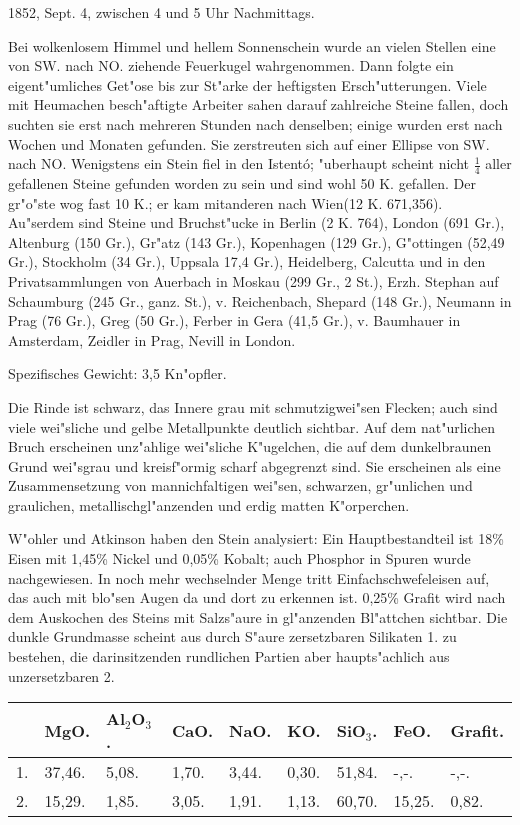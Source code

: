 \documentclass[a4paper, 11pt, oneside]{article}
\begin{document}
1852, Sept. 4, zwischen 4 und 5 Uhr Nachmittags.

Bei wolkenlosem Himmel und hellem Sonnenschein wurde an vielen Stellen eine von SW. nach NO. ziehende Feuerkugel wahrgenommen. Dann folgte ein eigent"umliches Get"ose bis zur St"arke der heftigsten Ersch"utterungen. Viele mit Heumachen besch"aftigte Arbeiter sahen darauf zahlreiche Steine fallen, doch suchten sie erst nach mehreren Stunden nach denselben; einige wurden erst nach Wochen und Monaten gefunden. Sie zerstreuten sich auf einer Ellipse von SW. nach NO. Wenigstens ein Stein fiel in den Istentó; "uberhaupt scheint nicht $\frac{1}{4}$ aller gefallenen Steine gefunden worden zu sein und sind wohl 50 K. gefallen. Der gr"o"ste wog fast 10 K.; er kam mitanderen nach Wien(12 K. 671,356). Au"serdem sind Steine und Bruchst"ucke in Berlin (2 K. 764), London (691 Gr.), Altenburg (150 Gr.), Gr"atz (143 Gr.), Kopenhagen (129 Gr.), G"ottingen (52,49 Gr.), Stockholm (34 Gr.), Uppsala 17,4 Gr.), Heidelberg, Calcutta und in den Privatsammlungen von Auerbach in Moskau (299 Gr., 2 St.), Erzh. Stephan auf Schaumburg (245 Gr., ganz. St.), v. Reichenbach, Shepard (148 Gr.), Neumann in Prag (76 Gr.), Greg (50 Gr.), Ferber in Gera (41,5 Gr.), v. Baumhauer in Amsterdam, Zeidler in Prag, Nevill in London.

Spezifisches Gewicht: 3,5 Kn"opfler.

Die Rinde ist schwarz, das Innere grau mit schmutzigwei"sen Flecken; auch sind viele wei"sliche und gelbe Metallpunkte deutlich sichtbar. Auf dem nat"urlichen Bruch erscheinen unz"ahlige wei"sliche K"ugelchen, die auf dem dunkelbraunen Grund wei"sgrau und kreisf"ormig scharf abgegrenzt sind. Sie erscheinen als eine Zusammensetzung von mannichfaltigen wei"sen, schwarzen, gr"unlichen und graulichen, metallischgl"anzenden und erdig matten K"orperchen.

W"ohler und Atkinson haben den Stein analysiert: Ein Hauptbestandteil ist 18\% Eisen mit 1,45\% Nickel und 0,05\% Kobalt; auch Phosphor in Spuren wurde nachgewiesen. In noch mehr wechselnder Menge tritt Einfachschwefeleisen auf, das auch mit blo"sen Augen da und dort zu erkennen ist. 0,25\% Grafit wird nach dem Auskochen des Steins mit Salzs"aure in gl"anzenden Bl"attchen sichtbar. Die dunkle Grundmasse scheint aus durch S"aure zersetzbaren Silikaten 1. zu bestehen, die darinsitzenden rundlichen Partien aber haupts"achlich aus unzersetzbaren 2.

\begin{table}[!ht]
    \centering
    \begin{tabular}{l l l l l l l l l}
         & MgO. & Al$_{2}$O$_{3}$. & CaO. & NaO. & KO. & SiO$_{3}$. & FeO. & Grafit. \\ \hline
        1. & 37,46. & 5,08. & 1,70. & 3,44. & 0,30. & 51,84. & -,-. & -,-. \\
        2. & 15,29. & 1,85. & 3,05. & 1,91. & 1,13. & 60,70. & 15,25. & 0,82. \\
    \end{tabular}
\end{table}
\end{document}
